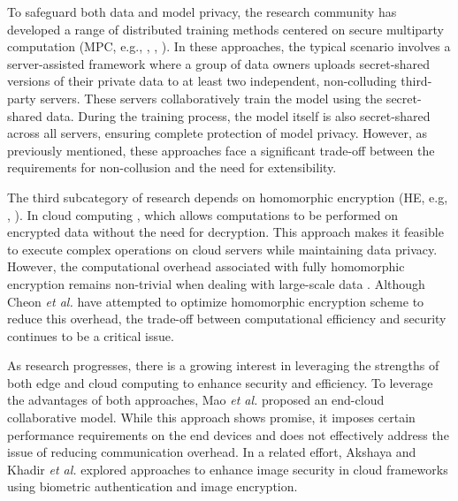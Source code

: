\documentclass[conference]{IEEEtran}
\begin{document}
To safeguard both data and model privacy, the research community has developed a range of distributed training methods centered on secure multiparty computation (MPC, e.g., \cite{7958569}, \cite{Escudero2020ImprovedPF}, \cite{Dalskov2020FantasticFH}). In these approaches, the typical scenario involves a server-assisted framework where a group of data owners uploads secret-shared versions of their private data to at least two independent, non-colluding third-party servers. These servers collaboratively train the model using the secret-shared data. During the training process, the model itself is also secret-shared across all servers, ensuring complete protection of model privacy. However, as previously mentioned, these approaches face a significant trade-off between the requirements for non-collusion and the need for extensibility.

The third subcategory of research depends on homomorphic encryption (HE, e.g, \cite{Nandakumar2019TowardsDN}, \cite{CiC-1-2-22}). In cloud computing \cite{gentry2009fully}, which allows computations to be performed on encrypted data without the need for decryption. This approach makes it feasible to execute complex operations on cloud servers while maintaining data privacy. However, the computational overhead associated with fully homomorphic encryption remains non-trivial when dealing with large-scale data \cite{xu2019cryptonn}. Although Cheon \textit{et al.} \cite{cheon2017homomorphic} have attempted to optimize homomorphic encryption scheme to reduce this overhead, the trade-off between computational efficiency and security continues to be a critical issue.

As research progresses, there is a growing interest in leveraging the strengths of both edge and cloud computing to enhance security and efficiency. To leverage the advantages of both approaches, Mao \textit{et al.} \cite{mao2017survey} proposed an end-cloud collaborative model. While this approach shows promise, it imposes certain performance requirements on the end devices and does not effectively address the issue of reducing communication overhead. In a related effort, Akshaya and Khadir \textit{et al.} \cite{kakkad2019biometric} explored approaches to enhance image security in cloud frameworks using biometric authentication and image encryption.

\end{document}
